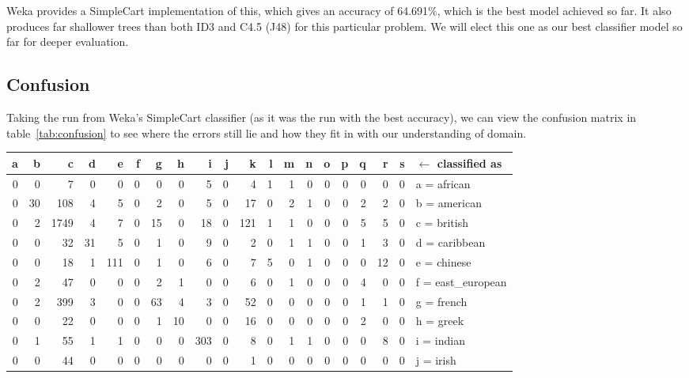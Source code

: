 \documentclass[11pt,a4paper]{article}
\begin{document}
Weka provides a SimpleCart
implementation of this, which gives an accuracy of 64.691\%, which is the best
model achieved so far. It also produces far shallower trees than both ID3
and C4.5 (J48) for this particular problem. We will elect this one as our best
classifier model so far for deeper evaluation.

\subsection{Confusion}

Taking the run from Weka's SimpleCart classifier (as it was the run with the 
best accuracy), we can view the confusion matrix in table~\ref{tab:confusion}
to see where the errors still lie and how they fit in with our understanding of domain.

\begin{sidewaystable}
  \centering
  \begin{tabular}{r r r r r r r r r r r r r r r r r r r | l}
    a&   b&   c&   d&   e&   f&   g&   h&   i&   j&   k&   l&   m&   n&   o&   p&   q&   r&   s& $\leftarrow$ classified as \\
    \hline
    0&   0&   7&   0&   0&   0&   0&   0&   5&   0&   4&   1&   1&   0&   0&   0&   0&   0&   0& a = african \\
    0&  30& 108&   4&   5&   0&   2&   0&   5&   0&  17&   0&   2&   1&   0&   0&   2&   2&   0& b = american \\
    0&   2&1749&   4&   7&   0&  15&   0&  18&   0& 121&   1&   1&   0&   0&   0&   5&   5&   0& c = british \\
    0&   0&  32&  31&   5&   0&   1&   0&   9&   0&   2&   0&   1&   1&   0&   0&   1&   3&   0& d = caribbean \\
    0&   0&  18&   1& 111&   0&   1&   0&   6&   0&   7&   5&   0&   1&   0&   0&   0&  12&   0& e = chinese \\
    0&   2&  47&   0&   0&   0&   2&   1&   0&   0&   6&   0&   1&   0&   0&   0&   4&   0&   0& f = east\_european \\
    0&   2& 399&   3&   0&   0&  63&   4&   3&   0&  52&   0&   0&   0&   0&   0&   1&   1&   0& g = french \\
    0&   0&  22&   0&   0&   0&   1&  10&   0&   0&  16&   0&   0&   0&   0&   0&   2&   0&   0& h = greek \\
    0&   1&  55&   1&   1&   0&   0&   0& 303&   0&   8&   0&   1&   1&   0&   0&   0&   8&   0& i = indian \\
    0&   0&  44&   0&   0&   0&   0&   0&   0&   0&   1&   0&   0&   0&   0&   0&   0&   0&   0& j = irish \\

\end{tabular}
\end{sidewaystable}
\end{document}

